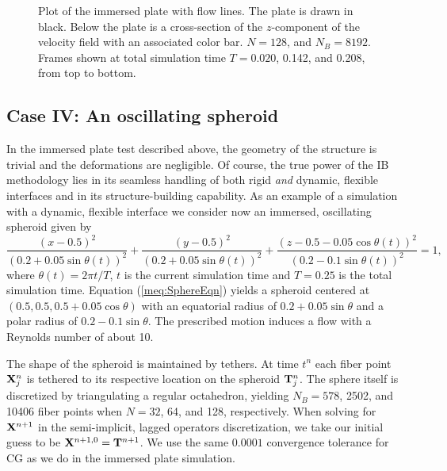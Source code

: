 \begin{figure}[htb]
\begin{center}
	\end{center}
	\caption{\small Plot of the immersed plate with flow lines. The plate is drawn in black. Below the plate is a cross-section of the $z$-component of the velocity field with an associated color bar. $N=128$, and $N_B=8192$. Frames shown at total simulation time $T=0.020$, 0.142, and 0.208, from top to bottom.}
\label{fig:TimeProgression_Plate}
\end{figure}



\subsection{Case IV: An oscillating spheroid}

In the immersed plate test described above, the geometry of the structure is trivial and the deformations are negligible. 
Of course, the true power of the IB methodology lies in its seamless handling of both rigid {\em and} dynamic, flexible interfaces and in its structure-building capability. As an example of a simulation with a dynamic, flexible  interface we consider now an immersed, oscillating spheroid
given by
\begin{equation}
\frac{(x-0.5)^2}{(0.2+0.05\sin\theta(t))^2} +
\frac{(y-0.5)^2}{(0.2+0.05\sin\theta(t))^2} +
\frac{(z-0.5-0.05\cos\theta(t))^2}{(0.2-0.1\sin\theta(t))^2} = 1,
\label{meq:SphereEqn}
\end{equation}
where $\theta(t) = 2\pi t/T$, $t$ is the current simulation time and $T=0.25$ is the total simulation time. Equation (\ref{meq:SphereEqn}) yields a spheroid centered at $(0.5,0.5,0.5+0.05\cos\theta)$ with an equatorial radius of $0.2+0.05\sin\theta$ and a polar radius of $0.2-0.1\sin\theta$.
The prescribed motion induces a flow with a Reynolds number of about 10.

The shape of the spheroid is maintained by tethers. At time $t^n$ each fiber point $\mathbf{X}^n_j$ is tethered to its respective location on the spheroid $\mathbf{T}^n_j$. The sphere itself is discretized by triangulating a regular octahedron, yielding $N_B=578$, 2502, and 10406 fiber points when $N=32$, 64, and 128,  respectively. When solving for $\mathbf{X}^{n+1}$ in the semi-implicit, lagged operators discretization, we take our initial guess to be $\mathbf{X}^{n+1,0}=\mathbf{T}^{n+1}$.
We use the same $0.0001$ convergence tolerance for CG as we do in the immersed plate simulation.

